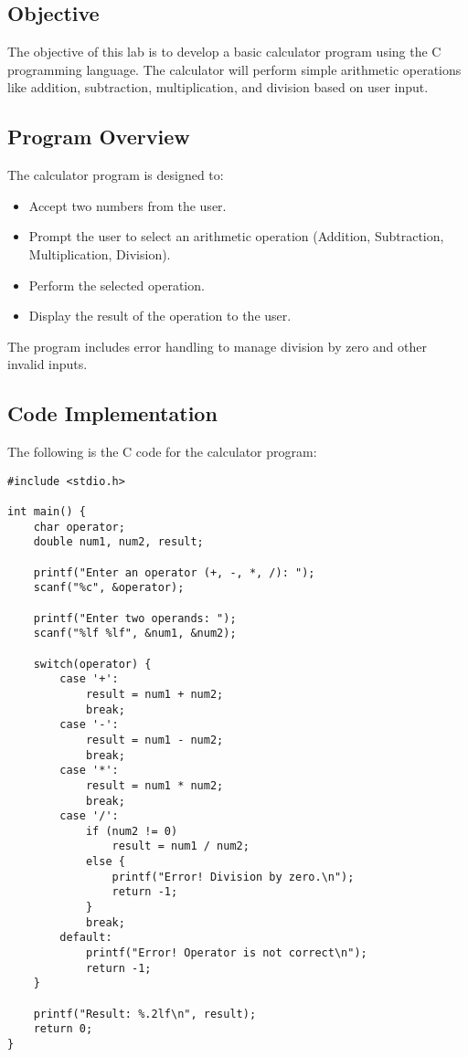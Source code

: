 \documentclass[a4paper,15pt]{article}
\begin{document}
\subsection{Objective}
The objective of this lab is to develop a basic calculator program using the C programming language. The calculator will perform simple arithmetic operations like addition, subtraction, multiplication, and division based on user input.

\subsection{Program Overview}
The calculator program is designed to:
\begin{itemize}
    \item Accept two numbers from the user.
    \item Prompt the user to select an arithmetic operation (Addition, Subtraction, Multiplication, Division).
    \item Perform the selected operation.
    \item Display the result of the operation to the user.
\end{itemize}

The program includes error handling to manage division by zero and other invalid inputs.

\subsection{Code Implementation}
The following is the C code for the calculator program:

\begin{verbatim}
#include <stdio.h>

int main() {
    char operator;
    double num1, num2, result;

    printf("Enter an operator (+, -, *, /): ");
    scanf("%c", &operator);

    printf("Enter two operands: ");
    scanf("%lf %lf", &num1, &num2);

    switch(operator) {
        case '+':
            result = num1 + num2;
            break;
        case '-':
            result = num1 - num2;
            break;
        case '*':
            result = num1 * num2;
            break;
        case '/':
            if (num2 != 0)
                result = num1 / num2;
            else {
                printf("Error! Division by zero.\n");
                return -1;
            }
            break;
        default:
            printf("Error! Operator is not correct\n");
            return -1;
    }

    printf("Result: %.2lf\n", result);
    return 0;
}
\end{verbatim}
\end{document}
